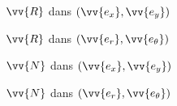 

\begin{enonce}
$\vv{R}$ dans $(\vv{e_x}, \vv{e_y})$
\end{enonce}




\begin{enonce}
$\vv{R}$ dans $(\vv{e_r}, \vv{e_\theta})$
\end{enonce}




\begin{enonce}
$\vv{N}$ dans $(\vv{e_x}, \vv{e_y})$
\end{enonce}




\begin{enonce}
$\vv{N}$ dans $(\vv{e_r}, \vv{e_\theta})$
\end{enonce}



\finEntrainement




